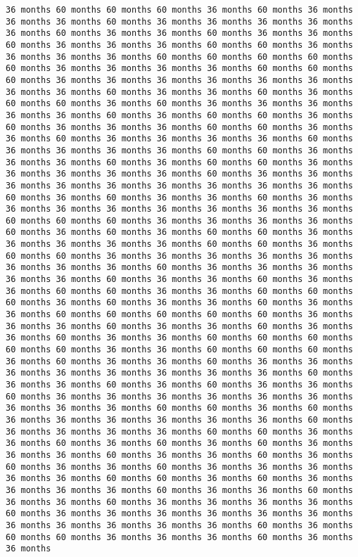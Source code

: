 \documentclass[11pt]{article}
\begin{document}
\begin{Verbatim}[commandchars=\\\{\}, frame=single, framerule=2mm, rulecolor=\color{outerrorbackground}]
36 months 60 months 60 months 60 months 36 months 60 months 36 months 36 months 36 months 60 months 36 months 36 months 36 months 36 months 36 months 60 months 36 months 36 months 60 months 36 months 36 months 60 months 36 months 36 months 36 months 60 months 60 months 36 months 36 months 36 months 36 months 60 months 60 months 60 months 60 months 60 months 36 months 36 months 36 months 36 months 60 months 60 months 60 months 36 months 36 months 36 months 36 months 36 months 36 months 36 months 36 months 60 months 36 months 36 months 60 months 36 months 60 months 60 months 36 months 60 months 36 months 36 months 36 months 36 months 36 months 60 months 36 months 60 months 60 months 36 months 60 months 36 months 36 months 36 months 60 months 60 months 36 months 36 months 60 months 36 months 36 months 36 months 36 months 60 months 36 months 36 months 36 months 36 months 60 months 60 months 36 months 36 months 36 months 60 months 36 months 60 months 60 months 36 months 36 months 36 months 36 months 36 months 60 months 36 months 36 months 36 months 36 months 36 months 36 months 36 months 36 months 36 months 60 months 36 months 60 months 36 months 36 months 60 months 36 months 36 months 36 months 36 months 36 months 36 months 36 months 36 months 60 months 60 months 60 months 36 months 36 months 36 months 36 months 60 months 36 months 60 months 36 months 60 months 60 months 36 months 36 months 36 months 36 months 36 months 60 months 60 months 36 months 60 months 60 months 36 months 36 months 36 months 36 months 36 months 36 months 36 months 36 months 60 months 36 months 36 months 36 months 36 months 36 months 60 months 36 months 36 months 60 months 36 months 36 months 60 months 60 months 36 months 36 months 60 months 60 months 60 months 36 months 60 months 36 months 36 months 60 months 36 months 36 months 60 months 60 months 60 months 60 months 60 months 36 months 36 months 36 months 60 months 36 months 36 months 60 months 36 months 36 months 60 months 36 months 36 months 60 months 60 months 60 months 60 months 60 months 36 months 36 months 60 months 60 months 60 months 36 months 60 months 36 months 36 months 60 months 36 months 36 months 36 months 36 months 36 months 36 months 36 months 36 months 60 months 36 months 36 months 60 months 36 months 60 months 36 months 36 months 60 months 36 months 36 months 36 months 36 months 36 months 36 months 36 months 36 months 36 months 60 months 60 months 36 months 60 months 36 months 36 months 36 months 36 months 36 months 36 months 60 months 36 months 36 months 36 months 36 months 60 months 60 months 36 months 36 months 60 months 36 months 60 months 36 months 60 months 36 months 36 months 36 months 60 months 36 months 36 months 60 months 36 months 60 months 36 months 36 months 60 months 36 months 36 months 36 months 36 months 36 months 60 months 60 months 36 months 60 months 36 months 36 months 36 months 36 months 60 months 36 months 36 months 60 months 36 months 36 months 60 months 36 months 36 months 36 months 36 months 60 months 36 months 36 months 36 months 36 months 36 months 36 months 36 months 36 months 36 months 36 months 36 months 60 months 36 months 60 months 60 months 36 months 36 months 36 months 60 months 36 months 36 months 
\end{Verbatim}
\end{document}
